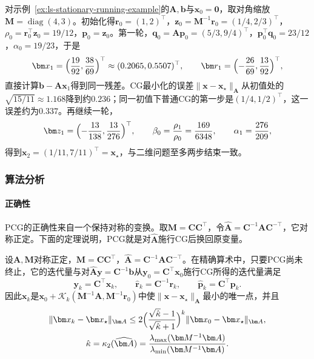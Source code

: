 \begin{example}[贯穿例上的一步PCG]
\label{ex:ls-pcg-one-step}
对示例~\ref{ex:ls-stationary-running-example}的$\bm A,\bm b$与$\bm x_0=\bm0$，取对角缩放$\bm M=\operatorname{diag}(4,3)$。初始化得$\bm r_0=(1,2)^\top$，$\bm z_0=\bm M^{-1}\bm r_0=(1/4,2/3)^\top$，$\rho_0=\bm r_0^\top\bm z_0=19/12$，$\bm p_0=\bm z_0$。第一轮，$\bm q_0=\bm A\bm p_0=(5/3,9/4)^\top$，$\bm p_0^\top\bm q_0=23/12$，$\alpha_0=19/23$，于是
\[
 \bm x_1=\Bigl(\frac{19}{92},\frac{38}{69}\Bigr)^\top\approx(0.2065,0.5507)^\top,\qquad
 \bm r_1=\Bigl(-\frac{26}{69},\frac{13}{92}\Bigr)^\top ,
\]
直接计算$\bm b-\bm A\bm x_1$得到同一残差。CG最小化的误差$\lVert\bm x-\bm x_\star\rVert_{\bm A}$从初值处的$\sqrt{15/11}\approx1.168$降到约$0.236$；同一初值下普通CG的第一步是$(1/4,1/2)^\top$，这一误差约为$0.337$。再继续一轮，
\[
 \bm z_1=\Bigl(-\frac{13}{138},\frac{13}{276}\Bigr)^\top,\qquad
 \beta_0=\frac{\rho_1}{\rho_0}=\frac{169}{6348},\qquad
 \alpha_1=\frac{276}{209},
\]
得到$\bm x_2=(1/11,7/11)^\top=\bm x_\star$，与二维问题至多两步结束一致。
\end{example}

\subsubsection{算法分析}

\paragraph{正确性}
PCG的正确性来自一个保持对称的变换。取$\bm M=\bm C\bm C^\top$，令$\widehat{\bm A}=\bm C^{-1}\bm A\bm C^{-\top}$，它对称正定。下面的定理说明，PCG就是对$\widehat{\bm A}$施行CG后换回原变量。

\begin{theorem}[PCG与变换后CG的等价]
\label{thm:ls-pcg-equivalence}
设$\bm A,\bm M$对称正定，$\bm M=\bm C\bm C^\top$，$\widehat{\bm A}=\bm C^{-1}\bm A\bm C^{-\top}$。在精确算术中，只要PCG尚未终止，它的迭代量与对$\widehat{\bm A}\bm y=\bm C^{-1}\bm b$从$\bm y_0=\bm C^\top\bm x_0$施行CG所得的迭代量满足
\[
 \bm y_k=\bm C^\top\bm x_k,\qquad \hat{\bm r}_k=\bm C^{-1}\bm r_k,\qquad \hat{\bm p}_k=\bm C^\top\bm p_k .
\]
因此$\bm x_k$是$\bm x_0+\mathcal K_k(\bm M^{-1}\bm A,\bm M^{-1}\bm r_0)$中使$\lVert\bm x-\bm x_\star\rVert_{\bm A}$最小的唯一点，并且
\[
 \begin{gathered}
 \lVert\bm x_k-\bm x_\star\rVert_{\bm A}\le2\Bigl(\frac{\sqrt{\hat\kappa}-1}{\sqrt{\hat\kappa}+1}\Bigr)^k\lVert\bm x_0-\bm x_\star\rVert_{\bm A},\\
 \hat\kappa=\kappa_2(\widehat{\bm A})=\frac{\lambda_{\max}(\bm M^{-1}\bm A)}{\lambda_{\min}(\bm M^{-1}\bm A)} .
 \end{gathered}
\]
\end{theorem}


